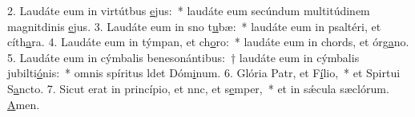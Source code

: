 2. Laudáte eum in virtútbus \uline{e}jus:~* laudáte eum secúndum multitúdinem magnitdinis \uline{e}jus.
3. Laudáte eum in sno t\uline{u}bæ:~* laudáte eum in psaltéri, et cíth\uline{a}ra.
4. Laudáte eum in týmpan, et ch\uline{o}ro:~* laudáte eum in chords, et órg\uline{a}no.
5. Laudáte eum in cýmbalis benesonántibus:~† laudáte eum in cýmbalis jubilti\uline{ó}nis:~* omnis spíritus ldet Dóm\uline{i}num.
6. Glória Patr, et F\uline{í}lio,~* et Spirtui S\uline{a}ncto.
7. Sicut erat in princípio, et nnc, et s\uline{e}mper,~* et in sǽcula sæclórum. \uline{A}men.
